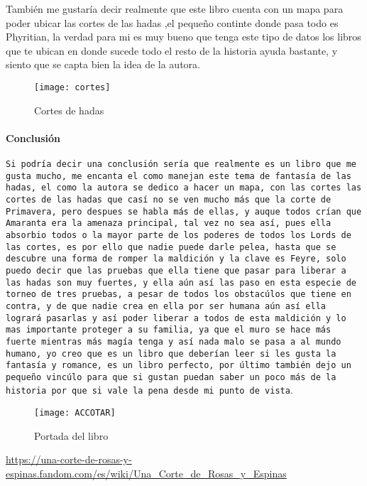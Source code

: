 \documentclass[12pt]{report}
\begin{document}
También me gustaría decir realmente que este libro cuenta con un mapa para poder ubicar las cortes de las hadas
,el pequeño continte donde pasa todo es Phyritian, la verdad para mi es muy bueno que tenga este tipo de datos
los libros que te ubican en donde sucede todo el resto de la historia ayuda bastante, y siento que se capta bien la idea de la autora.\\[0.2cm]

\begin{figure}[h]
   \centering
   \texttt{[image: cortes]}
   \caption{Cortes de hadas}
 \end{figure}

\paragraph{Conclusión}
\texttt{Si podría decir una conclusión sería que realmente es un libro que me gusta mucho, me encanta el como manejan este tema de fantasía de las hadas,
el como la autora se dedico a hacer un mapa, con las cortes las cortes de las hadas que casí no se ven mucho más que la corte de Primavera,
pero despues se habla más de ellas, y auque todos crían que Amaranta era la amenaza principal, tal vez no sea así, pues ella absorbio todos o la mayor parte
de los poderes de todos los Lords de las cortes, es por ello que nadie puede darle pelea, hasta que se descubre una forma de romper la maldición
y la clave es Feyre, solo puedo decir que las pruebas que ella tiene que pasar para liberar a las hadas son muy fuertes, y ella aún así las paso
en esta especie de torneo de tres pruebas, a pesar de todos los obstacúlos que tiene en contra, y de que nadie crea en ella por ser humana aún
así ella logrará pasarlas y así poder liberar a todos de esta maldición y lo mas importante proteger a su familia, ya que el muro
se hace más fuerte mientras más magía tenga y así nada malo se pasa a al mundo humano, yo creo que es un libro que deberían leer si les gusta
la fantasía y romance, es un libro perfecto, por último también dejo un pequeño vincúlo para que si gustan  puedan saber un poco más de la historia
por que si vale la pena desde mi punto de vista}.\\[1mm]

\begin{figure}[h]
   \centering
   \texttt{[image: ACCOTAR]}
   \caption{Portada del libro}
\end{figure}

\url{https://una-corte-de-rosas-y-espinas.fandom.com/es/wiki/Una\_Corte\_de\_Rosas\_y\_Espinas}
\end{document}
